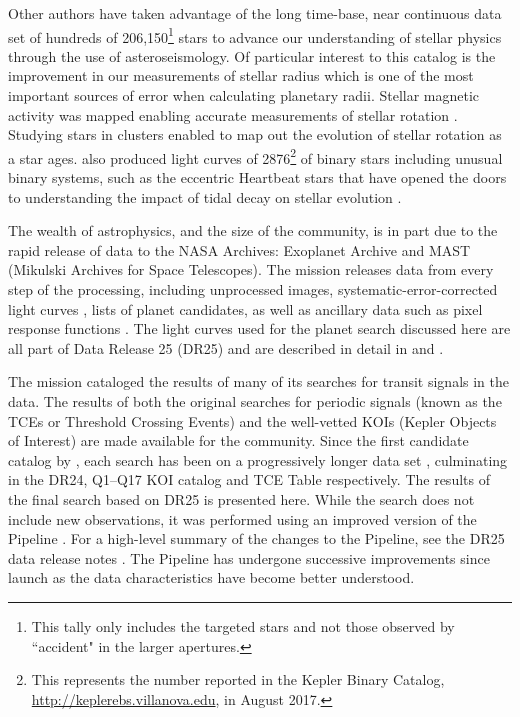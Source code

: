 Other authors have taken advantage of the long time-base, near continuous data set of hundreds of 206,150\footnote{This tally only includes the targeted stars and not those observed by ``accident" in the larger apertures.} stars to advance our understanding of stellar physics through the use of asteroseismology. Of particular interest to this catalog is the improvement in our measurements of stellar radius \citep[e.g.][]{Huber2014a,Mathur2017ApJS} which is one of the most important sources of error when calculating planetary radii. Stellar magnetic activity was mapped enabling accurate measurements of stellar rotation \citep[e.g.][]{Aigrain2015,Garcia2014,McQuillan2014}. Studying stars in clusters enabled \citet{Meibom2011} to map out the evolution of stellar rotation as a star ages. \Kepler{} also produced light curves of 2876\footnote{This represents the number reported in the Kepler Binary Catalog, \url{http://keplerebs.villanova.edu}, in August 2017.} of binary stars \citep{Prsa2011,Kirk2016} including unusual binary systems, such as the eccentric Heartbeat stars \citep{Welsh2011,Thompson2012,Shporer2016hb} that have opened the doors to understanding the impact of tidal decay on stellar evolution \citep[e.g.,][]{Hambleton2017,Fuller2017}.

The wealth of astrophysics, and the size of the \Kepler{} community, is in part due to the rapid release of \Kepler{} data to the NASA Archives: Exoplanet Archive \citep[][]{Akeson2013} and MAST (Mikulski Archives for Space Telescopes). The \Kepler{} mission releases data from every step of the processing, including unprocessed images, systematic-error-corrected light curves \citep{Stumpe2014}, lists of planet candidates, as well as ancillary data such as pixel response functions \citep{Bryson2010b}. The light curves used for the planet search discussed here are all part of Data Release 25 (DR25) and are described in detail in \citet{DRN25} and \citet{KDCH}.

The mission cataloged the results of many of its searches for transit signals in the data. The results of both the original searches for periodic signals (known as the TCEs or Threshold Crossing Events) and the well-vetted KOIs (Kepler Objects of Interest) are made available for the community.  Since the first candidate catalog by \citet{Borucki2011a}, each search has been on a progressively longer data set \citep{Batalha2013, Burke2014, Rowe2015cat, Mullally2015cat}, culminating in the DR24, Q1--Q17 KOI catalog \citep{Coughlin2016} and TCE Table \citep{Seader2015} respectively.  The results of the final search based on DR25 is presented here. While the search does not include new observations, it was performed using an improved version of the \Kepler{}Pipeline \citep[version 9.3][]{Jenkins2017}. For a high-level summary of the changes to the Pipeline, see the DR25 data release notes \citep{DRN25}. The \Kepler{} Pipeline has undergone successive improvements since launch as the data characteristics have become better understood.

